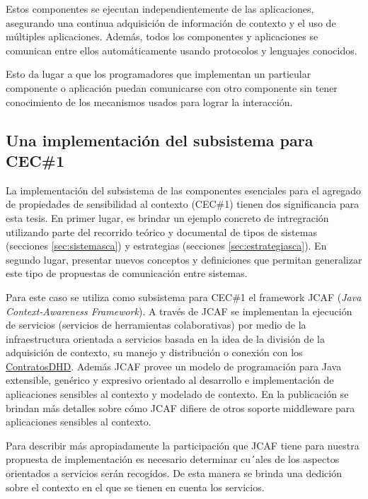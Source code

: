 \begin{itemize}
Estos componentes se ejecutan independientemente de las aplicaciones, asegurando una continua adquisición de información de contexto y el uso de múltiples aplicaciones. Además, todos los componentes y aplicaciones se comunican entre ellos automáticamente usando protocolos y lenguajes conocidos.

Esto da lugar a que los programadores que implementan un particular componente o aplicación puedan comunicarse con otro componente sin tener conocimiento de los mecanismos usados para lograr la interacción.

\parskip=1cm 

\subsection{Una implementación del subsistema para CEC\#1}

La implementación del subsistema de las componentes esenciales para el agregado de propiedades de sensibilidad al contexto (CEC\#1) tienen dos significancia para esta tesis. En primer lugar, es brindar un ejemplo concreto de intregración utilizando parte del recorrido teórico y documental de tipos de sistemas (secciones \ref{sec:sistemasca})  y estrategias (secciones \ref{sec:estrategiasca}). En segundo lugar, presentar nuevos conceptos y definiciones que permitan generalizar este tipo de propuestas de comunicación entre sistemas. 

Para este caso se utiliza como subsistema para CEC\#1 el framework JCAF  (\textit{Java Context-Awareness Framework}). A través de JCAF se implementan la ejecución de servicios (servicios de herramientas colaborativas) por medio de la infraestructura orientada a servicios basada en la idea de la división de la adquisición de contexto, su manejo y  distribución o conexión con los \hyperref[contratosDHD]{ContratosDHD}. Además JCAF provee un modelo de programación para Java extensible, genérico y expresivo orientado al desarrollo e implementación de aplicaciones sensibles al contexto y modelado de contexto. En la  publicación \cite{JCAF} se brindan más detalles sobre cómo JCAF difiere de otros soporte middleware para aplicaciones sensibles al contexto. 


Para describir más apropiadamente la participación que JCAF tiene para nuestra propuesta de implementación es necesario determinar cu´ales de los aspectos orientados a servicios serán recogidos. De esta manera se brinda una dedición sobre el contexto en el que se tienen en cuenta los servicios.



\end{itemize}
